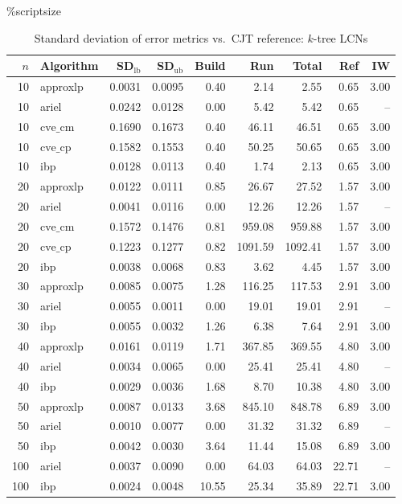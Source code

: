 \documentclass{article}
\begin{document}
\begin{table}[ht]
\centering
\%scriptsize
\caption{Standard deviation of error metrics vs.\ CJT reference: $k$-tree LCNs}
\begin{tabular}{rlrrrrrrr}
\toprule
 $n$ & Algorithm & SD$_{\text{lb}}$ & SD$_{\text{ub}}$ & Build & Run & Total & Ref & IW \\
\midrule
 10 & approxlp & 0.0031 & 0.0095 & 0.40 & 2.14 & 2.55 & 0.65 & 3.00 \\
 10 & ariel & 0.0242 & 0.0128 & 0.00 & 5.42 & 5.42 & 0.65 & -- \\
 10 & $\text{cve\_cm}$ & 0.1690 & 0.1673 & 0.40 & 46.11 & 46.51 & 0.65 & 3.00 \\
 10 & $\text{cve\_cp}$ & 0.1582 & 0.1553 & 0.40 & 50.25 & 50.65 & 0.65 & 3.00 \\
 10 & ibp & 0.0128 & 0.0113 & 0.40 & 1.74 & 2.13 & 0.65 & 3.00 \\
 \hline
 20 & approxlp & 0.0122 & 0.0111 & 0.85 & 26.67 & 27.52 & 1.57 & 3.00 \\
 20 & ariel & 0.0041 & 0.0116 & 0.00 & 12.26 & 12.26 & 1.57 & -- \\
 20 & $\text{cve\_cm}$ & 0.1572 & 0.1476 & 0.81 & 959.08 & 959.88 & 1.57 & 3.00 \\
 20 & $\text{cve\_cp}$ & 0.1223 & 0.1277 & 0.82 & 1091.59 & 1092.41 & 1.57 & 3.00 \\
 20 & ibp & 0.0038 & 0.0068 & 0.83 & 3.62 & 4.45 & 1.57 & 3.00 \\
 \hline
 30 & approxlp & 0.0085 & 0.0075 & 1.28 & 116.25 & 117.53 & 2.91 & 3.00 \\
 30 & ariel & 0.0055 & 0.0011 & 0.00 & 19.01 & 19.01 & 2.91 & -- \\
 30 & ibp & 0.0055 & 0.0032 & 1.26 & 6.38 & 7.64 & 2.91 & 3.00 \\
 \hline
 40 & approxlp & 0.0161 & 0.0119 & 1.71 & 367.85 & 369.55 & 4.80 & 3.00 \\
 40 & ariel & 0.0034 & 0.0065 & 0.00 & 25.41 & 25.41 & 4.80 & -- \\
 40 & ibp & 0.0029 & 0.0036 & 1.68 & 8.70 & 10.38 & 4.80 & 3.00 \\
 \hline
 50 & approxlp & 0.0087 & 0.0133 & 3.68 & 845.10 & 848.78 & 6.89 & 3.00 \\
 50 & ariel & 0.0010 & 0.0077 & 0.00 & 31.32 & 31.32 & 6.89 & -- \\
 50 & ibp & 0.0042 & 0.0030 & 3.64 & 11.44 & 15.08 & 6.89 & 3.00 \\
 \hline
 100 & ariel & 0.0037 & 0.0090 & 0.00 & 64.03 & 64.03 & 22.71 & -- \\
 100 & ibp & 0.0024 & 0.0048 & 10.55 & 25.34 & 35.89 & 22.71 & 3.00 \\
\bottomrule
\end{tabular}
\end{table}
\end{document}
